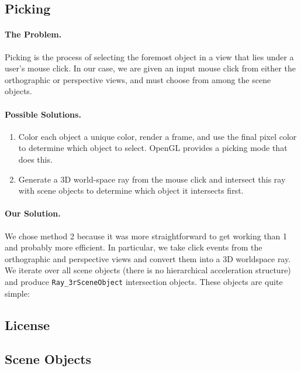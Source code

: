 \subsection{Picking}\label{appdx:picking}

\paragraph{The Problem.} Picking is the process of selecting the foremost object
in a view that lies under a user's mouse click. In our case, we are given an
input mouse click from either the orthographic or perspective views, and must
choose from among the scene objects.

\paragraph{Possible Solutions.}

\begin{enumerate}
  \item Color each object a unique color, render a frame, and use the
  final pixel color to determine which object to select. OpenGL provides a
  picking mode that does this.
  \item Generate a 3D world-space ray from the mouse click and intersect this
  ray with scene objects to determine which object it intersects first. 
\end{enumerate}

\paragraph{Our Solution.} We chose method 2 because it was more straightforward
to get working than 1 and probably more efficient. In particular, we take click
events from the orthographic and perspective views and convert them into a 3D
worldspace ray. We iterate over all scene objects (there is no hierarchical
acceleration structure) and produce \texttt{Ray\_3rSceneObject} intersection
objects. These objects are quite simple:

\subsection{License}\label{appdx:license}

\subsection{Scene Objects}\label{appdx:scene-objects}

